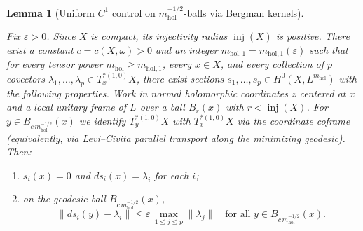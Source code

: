 \documentclass[11pt]{article}
\numberwithin{equation}{section}  %
\theoremstyle{plain}
\newtheorem{lemma}[theorem]{Lemma}
\theoremstyle{definition}
\theoremstyle{remark}
\newcommand{\mhol}{m_{\mathrm{hol}}} %
\begin{document}
\begin{lemma}[Uniform $C^1$ control on $\mhol^{-1/2}$-balls via Bergman kernels]
\label{lem:bergman-control}

{
Fix $\varepsilon>0$. Since $X$ is compact, its injectivity radius $\operatorname{inj}(X)$ is positive.
There exist a constant $c=c(X,\omega)>0$ and an integer $m_{\mathrm{hol},1}=m_{\mathrm{hol},1}(\varepsilon)$ such that for every
tensor power $\mhol\ge m_{\mathrm{hol},1}$, every $x\in X$, and every collection of $p$ covectors
$\lambda_1,\ldots,\lambda_p\in T_x^{*(1,0)}X$, there exist sections $s_1,\ldots,s_p\in H^0(X,L^{\mhol})$
with the following properties.
Work in normal holomorphic coordinates $z$ centered at $x$ and a local unitary frame of $L$ over a ball $B_r(x)$ with
$r<\operatorname{inj}(X)$. For $y\in B_{c\,\mhol^{-1/2}}(x)$ we identify $T_y^{*(1,0)}X$ with $T_x^{*(1,0)}X$
via the coordinate coframe (equivalently, via Levi--Civita parallel transport along the minimizing geodesic).
Then:
\begin{enumerate}
\item[\textnormal{(i)}] $s_i(x)=0$ and $ds_i(x)=\lambda_i$ for each $i$;
\item[\textnormal{(ii)}] on the geodesic ball $B_{c\,\mhol^{-1/2}}(x)$,
\[
\|ds_i(y)-\lambda_i\|\le \varepsilon\,\max_{1\le j\le p}\|\lambda_j\|
\quad\text{for all } y\in B_{c\,\mhol^{-1/2}}(x).
\]
\end{enumerate}
}

\end{lemma}
\end{document}
